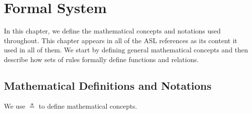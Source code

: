 \chapter{Formal System}
\label{chap:formal}

In this chapter, we define the mathematical concepts and notations used throughout.
This chapter appears in all of the ASL references as its content it used in all of them.
We start by defining general mathematical concepts
and then describe how sets of rules formally define functions and relations.

\section{Mathematical Definitions and Notations}

We use $\triangleq$ to define mathematical concepts.


